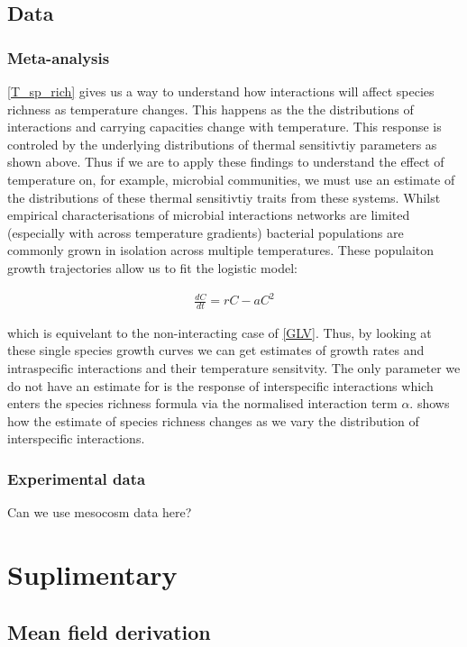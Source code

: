 \documentclass{article}
\begin{document}
\subsection{Data}
\subsubsection{Meta-analysis}
\cref{T_sp_rich} gives us a way to understand how interactions will affect species richness as temperature changes. This happens as the the distributions of interactions and carrying capacities change with temperature. This response is controled by the underlying distributions of thermal sensitivtiy parameters as shown above. Thus if we are to apply these findings to understand the effect of temperature on, for example, microbial communities, we must use an estimate of the distributions of these thermal sensitivtiy traits from these systems. Whilst empirical characterisations of microbial interactions networks are limited (especially with across temperature gradients) bacterial populations are commonly grown in isolation across multiple temperatures. These populaiton growth trajectories allow us to fit the logistic model:

\begin{align}
  \frac{dC}{dt} = rC - aC^2
\end{align}

which is equivelant to the non-interacting case of \cref{GLV}. Thus, by looking at these single species growth curves we can get estimates of growth rates and intraspecific interactions and their temperature sensitvity. The only parameter we do not have an estimate for is the response of interspecific interactions which enters the species richness formula via the normalised interaction term $\alpha$.  shows how the estimate of species richness changes as we vary the distribution of interspecific interactions.

\subsubsection{Experimental data}

Can we use mesocosm data here?

\section{Suplimentary}
\subsection{Mean field derivation}
\end{document}
